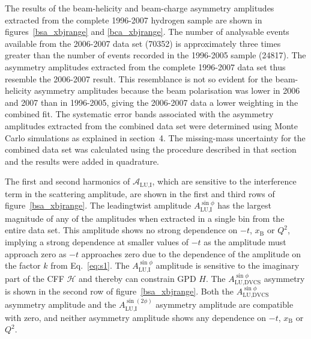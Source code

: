The results of the beam-helicity and beam-charge asymmetry amplitudes extracted from the complete 1996-2007 hydrogen sample are shown in figures~\ref{bsa_xbjrange} and \ref{bca_xbjrange}. The number of analysable events available from the 2006-2007 data set (70352) is approximately three times greater than the number of events recorded in the 1996-2005 sample (24817). The  asymmetry amplitudes extracted from the complete 1996-2007 data set thus resemble the 2006-2007 result. This resemblance is not so evident for the beam-helicity asymmetry amplitudes because the beam polarisation was lower in 2006 and 2007 than in 1996-2005, giving the 2006-2007 data a lower weighting in the combined fit. The systematic error bands associated with the asymmetry amplitudes extracted from the combined data set were determined using Monte Carlo simulations as explained in section~4. The missing-mass uncertainty for the combined data set was calculated using the procedure described in that section and the results were added in quadrature.



The first and second harmonics of $\mathcal{A}_{\textrm{LU,I}}$, which are
sensitive to the interference term in the scattering amplitude, are shown in the first and third rows of figure~\ref{bsa_xbjrange}. The leading\red{-}twist amplitude $A_{\textrm{LU,I}}^{\sin\phi}$ has the largest magnitude of any of the amplitudes when extracted in a single bin from the entire data set. This amplitude shows no strong dependence on $-t$, $x_{\textrm{B}}$ or $Q^{2}$, implying a strong dependence at smaller values of $-t$ as the amplitude must approach zero as $-t$ approaches zero due to the dependence of the amplitude on the factor $k$ from Eq.~\ref{eq:s1}. The $A_{\textrm{LU,I}}^{\sin\phi}$ amplitude is sensitive to the imaginary part of the CFF $\mathcal{H}$ and thereby can constrain GPD $\textit{H}$. The $A_{\textrm{LU,DVCS}}^{\sin\phi}$ asymmetry is shown in the second row of figure~\ref{bsa_xbjrange}. Both the $A_{\textrm{LU,DVCS}}^{\sin\phi}$ asymmetry amplitude and the $A_{\textrm{LU,I}}^{\sin(2\phi)}$ asymmetry amplitude are compatible with zero, and neither asymmetry amplitude shows any dependence on $-t$, $x_{\textrm{B}}$ or $Q^{2}$.

